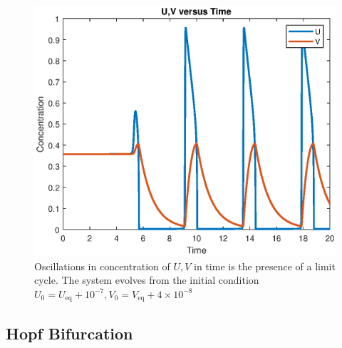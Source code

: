 \documentclass[twocolumn,amsmath,amssymb,aps]{revtex4}
\begin{document}
\begin{figure}[!htb]
	\centering
	\includegraphics[scale=0.5]{perturbed.eps}
	\caption{Oscillations in concentration of $U,V$ in time is the presence of a limit cycle. The system evolves from the initial condition $U_0 = U_{\text{eq}} + 10^{-7}, V_0 = V_{\text{eq}} + 4\times 10^{-8}$}
	\label{fig:Perturbed}
\end{figure}



\subsection{Hopf Bifurcation}
\end{document}
